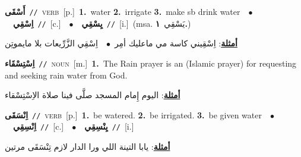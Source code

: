 \documentclass[10pt,a4paper,twoside]{article} %
\begin{document}
\begin{multicols}{2}
{\setlength\topsep{0pt}\textbf{\foreignlanguage{arabic}{أَسْقَى}}\ {\color{gray}\texttt{//}\color{black}}\ \textsc{verb}\ [p.]\ \textbf{1.}~water  \textbf{2.}~irrigate  \textbf{3.}~make sb drink water\ \ $\bullet$\ \ \setlength\topsep{0pt}\textbf{\foreignlanguage{arabic}{اِسْقِي}}\ {\color{gray}\texttt{//}\color{black}}\ [c.]\ \ $\bullet$\ \ \setlength\topsep{0pt}\textbf{\foreignlanguage{arabic}{يِسْقِي}}\ {\color{gray}\texttt{//}\color{black}}\ [i.]\ \color{gray}(msa. \foreignlanguage{arabic}{يَسْقِي}~\foreignlanguage{arabic}{\textbf{١.}})\color{black}\  \begin{flushright}\color{gray}\foreignlanguage{arabic}{\textbf{\underline{\foreignlanguage{arabic}{أمثلة}}}: اِسْقِيني كاسة مي ماعليك أمِر\ $\bullet$\ \  اِسْقِي الزَّرِّيعات بلا مايموتِن}\end{flushright}\color{black}} \vspace{2mm}

{\setlength\topsep{0pt}\textbf{\foreignlanguage{arabic}{اِسْتِسْقَاء}}\ {\color{gray}\texttt{//}\color{black}}\ \textsc{noun}\ [m.]\ \textbf{1.}~The Rain prayer is an (Islamic prayer) for requesting and seeking rain water from God.\  \begin{flushright}\color{gray}\foreignlanguage{arabic}{\textbf{\underline{\foreignlanguage{arabic}{أمثلة}}}: اليوم إِمام المسجد صلَّى فينا صلاة الاِسْتِسْقاء}\end{flushright}\color{black}} \vspace{2mm}

{\setlength\topsep{0pt}\textbf{\foreignlanguage{arabic}{اِنْسَقَى}}\ {\color{gray}\texttt{//}\color{black}}\ \textsc{verb}\ [p.]\ \textbf{1.}~be watered.  \textbf{2.}~be irrigated.  \textbf{3.}~be given water\ \ $\bullet$\ \ \setlength\topsep{0pt}\textbf{\foreignlanguage{arabic}{اِنْسِقِي}}\ {\color{gray}\texttt{//}\color{black}}\ [c.]\ \ $\bullet$\ \ \setlength\topsep{0pt}\textbf{\foreignlanguage{arabic}{يِنْسِقِي}}\ {\color{gray}\texttt{//}\color{black}}\ [i.]\  \begin{flushright}\color{gray}\foreignlanguage{arabic}{\textbf{\underline{\foreignlanguage{arabic}{أمثلة}}}: يابا التينة اللي ورا الدار لازم تِنْسَقَى مرتين}\end{flushright}\color{black}} \vspace{2mm}


\end{multicols}
\end{document}
